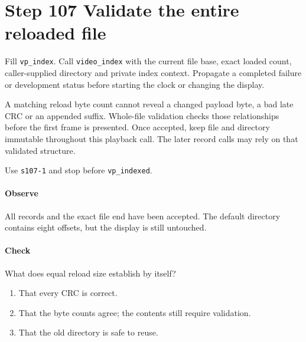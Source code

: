 \section{Step 107 Validate the entire reloaded file}
Fill \texttt{vp\_index}. Call \texttt{video\_index} with the current file base, exact loaded count, caller-supplied directory and private index context. Propagate a completed failure or development status before starting the clock or changing the display.

A matching reload byte count cannot reveal a changed payload byte, a bad late CRC or an appended suffix. Whole-file validation checks those relationships before the first frame is presented. Once accepted, keep file and directory immutable throughout this playback call. The later record calls may rely on that validated structure.

Use \texttt{s107-1} and stop before \texttt{vp\_indexed}.

\paragraph{Observe} All records and the exact file end have been accepted. The default directory contains eight offsets, but the display is still untouched.

\paragraph{Check} What does equal reload size establish by itself?
\begin{enumerate}[label=\Alph*.]
  \item That every CRC is correct.
  \item That the byte counts agree; the contents still require validation.
  \item That the old directory is safe to reuse.
\end{enumerate}
